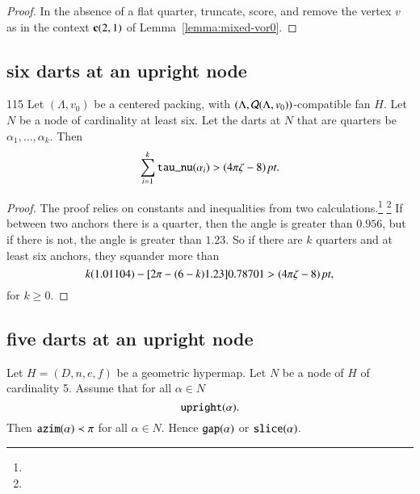 \begin{proof}
In the absence of a flat quarter, truncate, score, and remove the
vertex $v$ as in the context ${\operatorname{\bf c}}{(2,1)}$ of
Lemma~\ref{lemma:mixed-vor0}. 
\end{proof}

\subsection{six darts at an upright node}
\begin{lemma}\label{lemma:context6-erase}{115}  
Let $(\Lambda,v_0)$ be a centered packing, 
with $(\Lambda,{\mathcal Q}(\Lambda,v_0))$-compatible fan $H$.
Let $N$ be a node of cardinality at least six.
Let the darts at $N$ that are quarters be
$\alpha_1,\ldots,\alpha_k$.
Then 
  $$
  \sum_{i=1}^k{\operatorname{{\texttt{tau\_nu}}}}(\alpha_i) > (4\pi\zeta-8)\,\hbox{\it pt}.
  $$
\end{lemma}

\begin{proof}
The proof relies on constants and inequalities from two
calculations.\footnote{} %
\footnote{} %
If between two anchors there is a quarter, then the angle is
greater than $0.956$, but if there is not,  the angle is greater than
$1.23$.  So if there are $k$ quarters and at least six anchors, they
squander more than
    $$ k (1.01104) - [2\pi-(6-k)1.23]0.78701 > (4\pi\zeta-8)\,\hbox{\it pt},$$
for $k\ge0$.
\end{proof}

\subsection{five darts at an upright node}
\label{sec:5updart}

\begin{lemma}\label{a:5dart:concave}  
Let $H=(D,n,e,f)$ be a geometric
hypermap.  Let $N$ 
be a node of $H$ of cardinality 5.    Assume that for all $\alpha\in N$
  $$
  {\operatorname{{\texttt{upright}}}}(\alpha).
  $$
Then ${\operatorname{{\texttt{azim}}}}(\alpha)\prec \pi$ for all $\alpha\in N$.
Hence ${\operatorname{{\texttt{gap}}}}(\alpha)$ or ${\operatorname{{\texttt{slice}}}}(\alpha)$.
\end{lemma}

